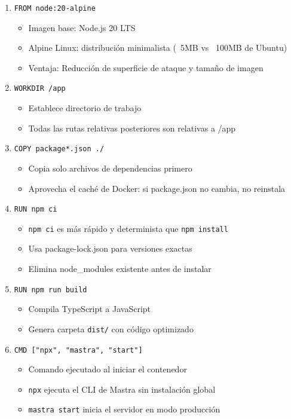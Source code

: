 \documentclass[12pt,a4paper]{article}
\begin{document}
\begin{enumerate}
    \item \texttt{FROM node:20-alpine}
    \begin{itemize}
        \item Imagen base: Node.js 20 LTS
        \item Alpine Linux: distribución minimalista (~5MB vs ~100MB de Ubuntu)
        \item Ventaja: Reducción de superficie de ataque y tamaño de imagen
    \end{itemize}

    \item \texttt{WORKDIR /app}
    \begin{itemize}
        \item Establece directorio de trabajo
        \item Todas las rutas relativas posteriores son relativas a /app
    \end{itemize}

    \item \texttt{COPY package*.json ./}
    \begin{itemize}
        \item Copia solo archivos de dependencias primero
        \item Aprovecha el caché de Docker: si package.json no cambia, no reinstala
    \end{itemize}

    \item \texttt{RUN npm ci}
    \begin{itemize}
        \item \texttt{npm ci} es más rápido y determinista que \texttt{npm install}
        \item Usa package-lock.json para versiones exactas
        \item Elimina node\_modules existente antes de instalar
    \end{itemize}

    \item \texttt{RUN npm run build}
    \begin{itemize}
        \item Compila TypeScript a JavaScript
        \item Genera carpeta \texttt{dist/} con código optimizado
    \end{itemize}

    \item \texttt{CMD ["npx", "mastra", "start"]}
    \begin{itemize}
        \item Comando ejecutado al iniciar el contenedor
        \item \texttt{npx} ejecuta el CLI de Mastra sin instalación global
        \item \texttt{mastra start} inicia el servidor en modo producción
    \end{itemize}
\end{enumerate}
\end{document}
